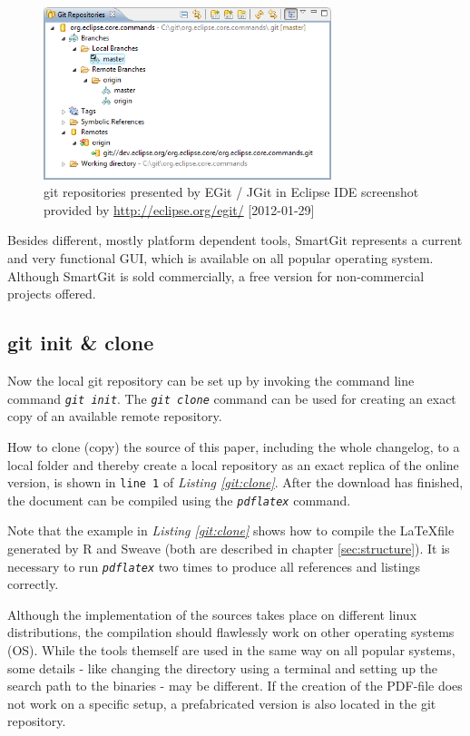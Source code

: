 \documentclass{ifacconf}
\begin{document}
\begin{figure}[h]
\begin{center}
\includegraphics[width=8.4cm]{pics/EGit.png}    %
\caption{git repositories presented by EGit / JGit in Eclipse IDE \newline 
screenshot provided by \url{http://eclipse.org/egit/} [2012-01-29]} 
\label{fig:JGit}
\end{center}
\end{figure}

Besides different, mostly platform dependent tools, 
SmartGit represents a current and very functional GUI, which
is available on all popular operating system. Although SmartGit is sold commercially,
a free version for non-commercial projects offered.


\subsection{git init \& clone}
Now the local git repository can be set up by invoking the
command line command \textit{\lstinline!git init!}. The \textit{\lstinline!git clone!} 
command can be used for creating an exact copy of an available remote repository.

How to clone (copy) the source of this paper, including the whole changelog, to a local folder 
and thereby create a local repository as an exact replica of the online version,
is shown in \verb|line 1| of \textit{Listing \ref{git:clone}}. After the download has
finished, the document can be compiled using the \textit{\lstinline!pdflatex!} command. 

Note that the example in \textit{Listing \ref{git:clone}} shows how to compile 
the \LaTeX file generated by R and Sweave (both are described in chapter \ref{sec:structure}).
It is necessary to run \textit{\lstinline!pdflatex!} two times to produce all references and
listings correctly. 

Although the implementation of the sources takes place on different
linux distributions, the compilation should flawlessly work on other operating systems (OS).
While the tools themself are used in the same way on all popular systems, some details
- like changing the directory using a terminal and setting up the search path to the binaries - may be different.
If the creation of the PDF-file does not work on a specific setup, a prefabricated
version is also located in the git repository. 
\end{document}
